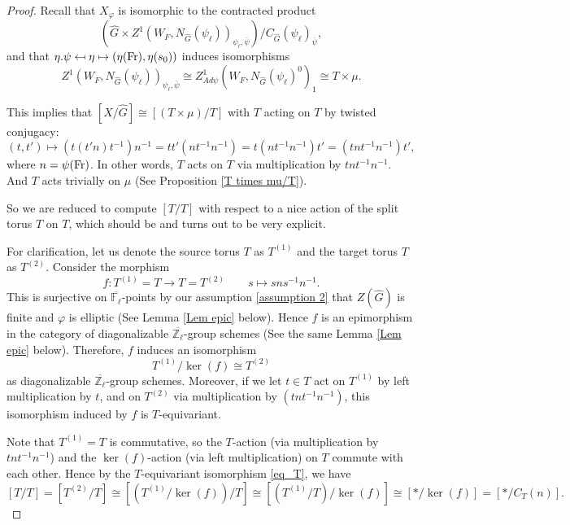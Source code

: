 \begin{proof}
	Recall that $X_{\varphi}$ is isomorphic to the contracted product 
	$$(\hat{G} \times Z^1(W_F, N_{\hat{G}}(\psi_{\ell}))_{\psi_{\ell}, \overline{\psi}})/C_{\hat{G}}(\psi_{\ell})_{\overline{\psi}},$$ 
	and that $\eta.\psi \mapsfrom \eta \mapsto (\eta(\operatorname{Fr}), \eta(s_0))$ induces isomorphisms
	$$Z^1(W_F, N_{\hat{G}}(\psi_{\ell}))_{\psi_{\ell}, \overline{\psi}} \cong Z^1_{Ad\psi}(W_F, N_{\hat{G}}(\psi_{\ell})^0)_1 \cong T \times \mu.$$
	
	This implies that $[X/\hat{G}] \cong [(T \times \mu)/T]$ with $T$ acting on $T$ by twisted conjugacy:
	$$(t, t') \mapsto \left(t(t'n)t^{-1}\right)n^{-1}=tt'(nt^{-1}n^{-1})=t(nt^{-1}n^{-1})t'=(tnt^{-1}n^{-1})t',$$
	where $n=\psi(\operatorname{Fr})$. In other words, $T$ acts on $T$ via multiplication by $tnt^{-1}n^{-1}$. And $T$ acts trivially on $\mu$ (See Proposition \ref{T times mu/T}).
	
	So we are reduced to compute $[T/T]$ with respect to a nice action of the split torus $T$ on $T$, which should be and turns out to be very explicit.
	
	For clarification, let us denote the source torus $T$ as $T^{(1)}$ and the target torus $T$ as $T^{(2)}$. Consider the morphism
	$$f: T^{(1)} = T \longrightarrow T = T^{(2)} \qquad s \longmapsto sns^{-1}n^{-1}.$$
	This is surjective on $\overline{\mathbb{F}_{\ell}}$-points by our assumption \ref{assumption 2} that $Z(\hat{G})$ is finite and $\varphi$ is elliptic (See Lemma \ref{Lem epic} below). Hence $f$ is an epimorphism in the category of diagonalizable $\overline{\mathbb{Z}_{\ell}}$-group schemes (See the same Lemma \ref{Lem epic} below). Therefore, $f$ induces an isomorphism 
	\begin{equation}\label{eq_T}
		T^{(1)}/\ker(f) \cong T^{(2)}
	\end{equation}
	as diagonalizable $\overline{\mathbb{Z}_{\ell}}$-group schemes. Moreover, if we let $t \in T$ act on $T^{(1)}$ by left multiplication by $t$, and on $T^{(2)}$ via multiplication by $(tnt^{-1}n^{-1})$, this isomorphism induced by $f$ is $T$-equivariant.
	
	Note that $T^{(1)}=T$ is commutative, so the $T$-action (via multiplication by $tnt^{-1}n^{-1}$) and the $\ker(f)$-action (via left multiplication) on $T$ commute with each other. Hence by the $T$-equivariant isomorphism \eqref{eq_T}, we have
	$$[T/T] = [T^{(2)}/T] \cong \left[\left(T^{(1)}/\ker(f)\right)/T\right] \cong \left[\left(T^{(1)}/T\right)/\ker(f)\right] \cong [*/\ker(f)] = [*/C_T(n)].$$ 
	

\end{proof}
